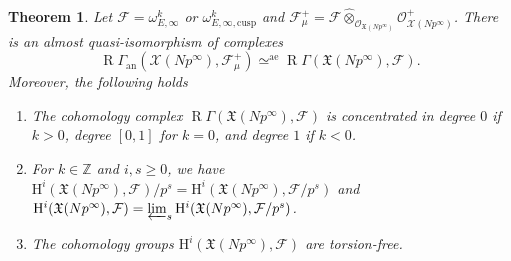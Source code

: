 \documentclass[JEP,XML,SOM,Unicode,published]{cedram}
\newcommand{\rae}{\mathrm{ae}}
\newcommand{\an}{\mathrm{an}}
\newcommand{\cusp}{\mathrm{cusp}}
\newcommand{\wotimes}{\mathbin{\widehat\otimes}}
\numberwithin{equation}{section}
\newtheorem{theo}[prop]{Theorem}
\theoremstyle{definition}
\newcommand{\bb}[1]{\mathbb{#1}}
\newcommand{\n}[1]{\mathcal{#1}}
\newcommand{\f}[1]{\mathfrak{#1}}
\newcommand{\s}[1]{\mathscr{#1}}
\DeclareMathOperator{\R}{R}
\begin{document}
\begin{theo}
\label{Theo2Intro}
Let $\n{F}= \omega^k_{E,\infty}$ or $\omega^k_{E,\infty,\cusp}$ and $\n{F}_{\mu}^+=\n{F}\wotimes_{\s{O}_{\f{X}(Np^\infty)}} \s{O}^+_{\n{X}(Np^\infty)}$. There is an almost quasi-isomorphism of complexes
\[
\R \Gamma_{\an}(\n{X}(Np^\infty), \n{F}^+_{\mu}) \simeq^{\rae} \R \Gamma(\f{X}(Np^\infty), \n{F}).
\]
Moreover, the following holds
\begin{enumerate}

\item The cohomology complex $\R \Gamma(\f{X}(Np^\infty), \n{F})$ is concentrated in degree $0$ if $k>0$, degree $[0,1]$ for $k=0$, and degree $1$ if $k<0$.

\item For $k\in \bb{Z}$ and $i,s\geq 0$, we have $\mathrm{H}^i(\f{X}(Np^\infty), \n{F})/p^s = \mathrm{H}^i(\f{X}(Np^\infty), \n{F}/p^s)$ and $\mathrm{H}^i(\f{X}(Np^\infty), \n{F})= \varprojlim_s \mathrm{H}^i(\f{X}(Np^\infty), \n{F}/p^s)$.

\item The cohomology groups $\mathrm{H}^i(\f{X}(Np^\infty), \n{F})$ are torsion-free.
\end{enumerate}
\end{theo}
\end{document}
